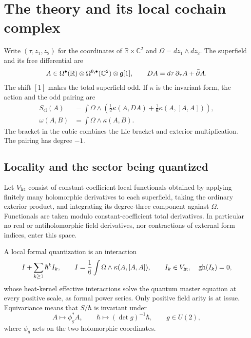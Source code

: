 \section{The theory and its local cochain complex}\label{sec:setting}

Write $(\tau,z_1,z_2)$ for the coordinates of
$\mathbb R\times\mathbb C^2$ and
$\Omega=dz_1\wedge dz_2$. The superfield and its free differential are
\[
 A\in\Omega^\bullet(\mathbb R)\otimes
          \Omega^{0,\bullet}(\mathbb C^2)\otimes\mathfrak g[1],
 \qquad
 DA=d\tau\,\partial_\tau A+\bar\partial A .
\]
The shift $[1]$ makes the total superfield odd. If $\kappa$ is the
invariant form, the action and the odd pairing are
\begin{equation}\label{eq:classical}
 \begin{split}
 S_{\mathrm{cl}}(A)
 &=\int\Omega\wedge
   \left(\frac12\kappa(A,DA)+\frac16\kappa(A,[A,A])\right),\\
 \omega(A,B)&=\int\Omega\wedge\kappa(A,B).
 \end{split}
\end{equation}
The bracket in the cubic combines the Lie bracket and exterior
multiplication. The pairing has degree $-1$.

\subsection{Locality and the sector being quantized}

Let $V_{\mathrm{ht}}$ consist of constant-coefficient local functionals obtained
by applying finitely many holomorphic derivatives to each
superfield, taking the ordinary exterior product, and integrating
its degree-three component against $\Omega$. Functionals are taken
modulo constant-coefficient total derivatives. In particular no
real or antiholomorphic field derivatives, nor contractions of
external form indices, enter this space.

\begin{definition}\label{def:quantization}
A local formal quantization is an interaction
\[
 I+\sum_{k\ge1}\hbar^k I_k,\qquad
 I=\frac16\int\Omega\wedge\kappa(A,[A,A]),\qquad
 I_k\in V_{\mathrm{ht}},\quad \operatorname{gh}(I_k)=0,
\]
whose heat-kernel effective interactions solve the quantum master
equation at every positive scale, as formal power series.
Only positive field arity is at issue.
Equivariance means that $S/\hbar$ is invariant under
\[
 A\longmapsto\phi_g^*A,\qquad
 \hbar\longmapsto(\det g)^{-1}\hbar,\qquad g\in U(2),
\]
where $\phi_g$ acts on the two holomorphic coordinates.
\end{definition}


